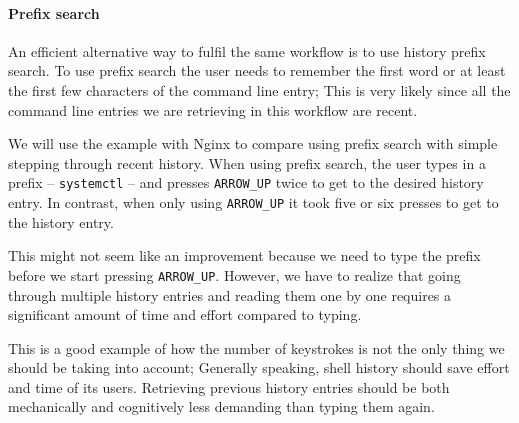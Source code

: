 


\paragraph{Prefix search}

An efficient alternative way to fulfil the same workflow is to use history prefix search. To use prefix search the user needs to remember the first word or at least the first few characters of the command line entry; This is very likely since all the command line entries we are retrieving in this workflow are recent.

We will use the example with Nginx to compare using prefix search with simple stepping through recent history. When using prefix search, the user types in a prefix -- \verb|systemctl| -- and presses \verb|ARROW_UP| twice to get to the desired history entry. In contrast, when only using \verb|ARROW_UP| it took five or six presses to get to the history entry.

This might not seem like an improvement because we need to type the prefix before we start pressing \verb|ARROW_UP|. However, we have to realize that going through multiple history entries and reading them one by one requires a significant amount of time and effort compared to typing. 
    
This is a good example of how the number of keystrokes is not the only thing we should be taking into account; Generally speaking, shell history should save effort and time of its users. Retrieving previous history entries should be both mechanically and cognitively less demanding than typing them again.\cite{greenberg1993computer}


